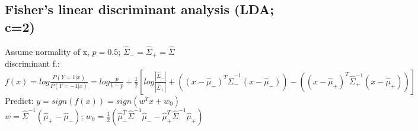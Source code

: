 \subsection*{Fisher's linear discriminant analysis (LDA; c=2)}
Assume normality of x, $p = 0.5$; $\hat{\Sigma}_- = \hat{\Sigma}_+ = \hat{\Sigma}$\\
discriminant f.: $f(x) = log\frac{P(Y=1|x)}{P(Y=-1|x)}=log \frac{p}{1-p} + \frac{1}{2}[log\frac{|\hat{\Sigma}_-|}{|\hat{\Sigma}_+|} + ((x - \hat{\mu}_-)^T \hat{\Sigma}_-^{-1} (x - \hat{\mu}_-)) - ((x - \hat{\mu}_+)^T \hat{\Sigma}_+^{-1} (x - \hat{\mu}_+))]$\\
Predict: $y = sign(f(x)) = sign (w^T x + w_0)$\\
$w = \hat{\Sigma}^{-1}(\hat{\mu}_+ - \hat{\mu}_-)$; $w_0 = \frac{1}{2}(\hat{\mu}_-^T\hat{\Sigma}^{-1}\hat{\mu}_- - \hat{\mu}_+^T \hat{\Sigma}^{-1}\hat{\mu}_+)$





